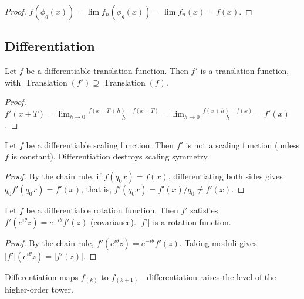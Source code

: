 \begin{proof}
$f(\phi_g(x)) = \lim f_n(\phi_g(x)) = \lim f_n(x) = f(x)$.
\end{proof}

\subsection{Differentiation}

\begin{proposition}\label{prop:diff_translation}
Let $f$ be a differentiable translation function. Then $f'$ is a translation function, with $\operatorname{Translation}(f') \supseteq \operatorname{Translation}(f)$.
\end{proposition}

\begin{proof}
$f'(x+T) = \lim_{h \to 0} \frac{f(x+T+h) - f(x+T)}{h} = \lim_{h \to 0} \frac{f(x+h) - f(x)}{h} = f'(x)$.
\end{proof}

\begin{proposition}\label{prop:diff_scaling}
Let $f$ be a differentiable scaling function. Then $f'$ is not a scaling function (unless $f$ is constant). Differentiation destroys scaling symmetry.
\end{proposition}

\begin{proof}
By the chain rule, if $f(q_0 x) = f(x)$, differentiating both sides gives $q_0 f'(q_0 x) = f'(x)$, that is, $f'(q_0 x) = f'(x)/q_0 \neq f'(x)$.
\end{proof}

\begin{proposition}\label{prop:diff_rotation}
Let $f$ be a differentiable rotation function. Then $f'$ satisfies $f'(e^{i\theta}z) = e^{-i\theta} f'(z)$ (covariance). $|f'|$ is a rotation function.
\end{proposition}

\begin{proof}
By the chain rule, $f'(e^{i\theta}z) = e^{-i\theta} f'(z)$. Taking moduli gives $|f'|(e^{i\theta}z) = |f'(z)|$.
\end{proof}

\begin{proposition}\label{prop:diff_higher}
Differentiation maps $f_{(k)}$ to $f_{(k+1)}$---differentiation raises the level of the higher-order tower.
\end{proposition}

